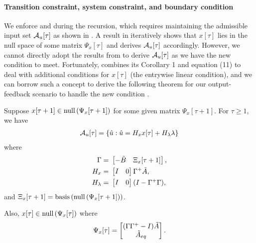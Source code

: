 \paragraph{Transition constraint, system constraint, and boundary condition}
We enforce  and  during the recursion, which requires maintaining the admissible input set $\mathcal{A}_u[\tau]$ as shown in \cite{tseng2020system}. A result in \cite{tseng2020system} iteratively shows that $x[\tau]$ lies in the null space of some matrix $\Psi_x[\tau]$ and derives $\mathcal{A}_u[\tau]$ accordingly. 
However, we cannot directly adopt the results from \cite{tseng2020system} to derive $\mathcal{A}_u[\tau]$ as we have the new condition  to meet. 
Fortunately, \cite{tseng2020system} combines its Corollary 1 and equation (11) to deal with additional conditions for $x[\tau]$ (the entrywise linear condition), and we can borrow such a concept to derive the following theorem for our output-feedback scenario to handle the new condition .
\begin{theorem}\label{thm:feasible_set_unstable}
  Suppose $x[\tau+1] \in \text{\rm null}\left(\Psi_x[\tau+1]\right)$ for some given matrix $\Psi_x[\tau+1]$. For $\tau \geq 1$, we have 
  \begin{align*}
    \mathcal{A}_u[\tau] = \{ \hat{u} : \hat{u} = H_x x[\tau] + H_\lambda \lambda \}
  \end{align*}
  where 
  \begin{align*}
    \Gamma =&\ \begin{bmatrix}-\tilde{B} & \Xi_x[\tau + 1]\end{bmatrix}, \\
    H_x =&\ \begin{bmatrix}I & 0\end{bmatrix} \Gamma^+ \tilde{A}, \\
    H_\lambda =&\ \begin{bmatrix}I & 0\end{bmatrix} (I - \Gamma^+ \Gamma),
  \end{align*}
  and $\Xi_x[\tau+1] = \text{\rm basis}\left(\text{\rm null}\left(\Psi_x[\tau+1]\right)\right)$.

  Also, $x[\tau] \in \text{\rm null}\left(\Psi_x[\tau]\right)$ where 
  \begin{align*}
    \Psi_x[\tau] = \begin{bmatrix}
      (\Gamma \Gamma^+ - I)\tilde{A}\\
      \tilde{A}_{eq}
    \end{bmatrix}.
  \end{align*}
\end{theorem}

